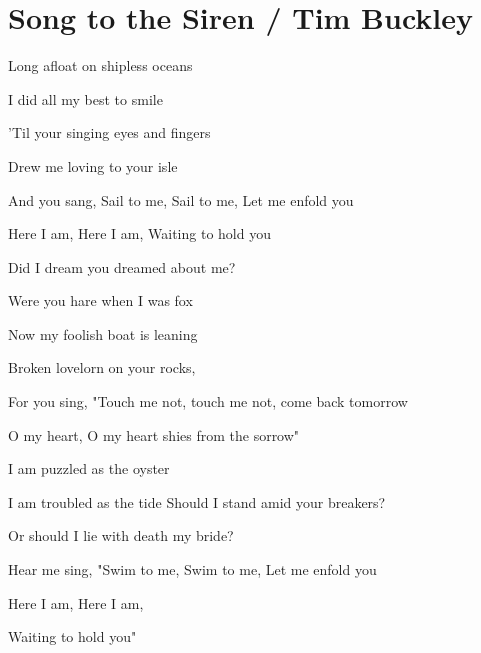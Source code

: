 \section{Song to the Siren / Tim Buckley}\label{sec:songtothesiren}

\Gmajor
\Dmajor
\Cmajor
\Eminor
\Fmajor

Long afloat on shipless oceans

I did all my best to smile

'Til your singing eyes and fingers

Drew me loving to your isle

And you sang, Sail to me, Sail to me, Let me enfold you                        

Here I am, Here I am, Waiting to hold you

Did I dream you dreamed about me?

Were you hare when I was fox

Now my foolish boat is leaning 

Broken lovelorn on your rocks,

For you sing, "Touch me not, touch me not, come back tomorrow

O my heart, O my heart shies from the sorrow" 

I am puzzled as the oyster

I am troubled as the tide
Should I stand amid your breakers?

Or should I lie with death my bride?

Hear me sing, "Swim to me, Swim to me, Let me enfold you

Here I am, Here I am, 

Waiting to hold you"

